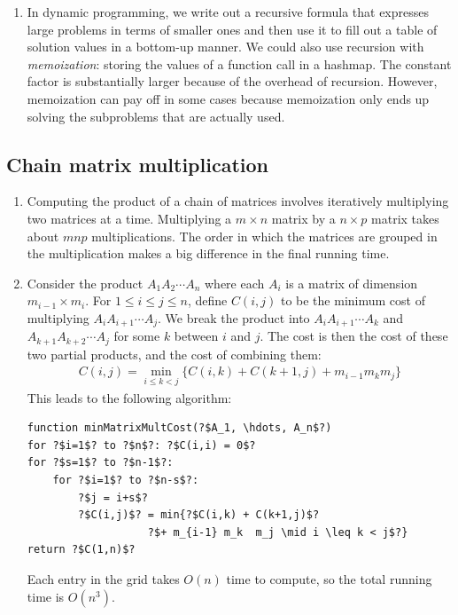 \documentclass[10pt]{article}
\begin{document}
\begin{multicols}{2}
\begin{addmargin}[0.8em]{0.5em}
\begin{enumerate}[label=(\alph*)]
        \item In dynamic programming, we write out a recursive formula that expresses large problems in terms of smaller ones and then use it to fill out a table of solution values in a bottom-up manner. We could also use recursion with \textit{memoization}: storing the values of a function call in a hashmap. The constant factor is substantially larger because of the overhead of recursion. However, memoization can pay off in some cases because memoization only ends up solving the subproblems that are actually used.
    \end{enumerate}    
    \vspace{-0.4cm}
    \subsection{Chain matrix multiplication}
    \vspace{-0.2cm}
    \begin{enumerate}[label=(\alph*)]
        \item Computing the product of a chain of matrices involves iteratively multiplying two matrices at a time. Multiplying a $m \times n$ matrix by a $n \times p$ matrix takes about $mnp$ multiplications. The order in which the matrices are grouped in the multiplication makes a big difference in the final running time.
        \item Consider the product $A_1A_2 \cdots A_n$ where each $A_i$ is a matrix of dimension $m_{i-1} \times m_i$. For $1 \leq i \leq j \leq n$, define $C(i,j)$ to be the minimum cost of multiplying $A_iA_{i+1} \cdots A_j$. We break the product into $A_iA_{i+1} \cdots A_k$ and $A_{k+1}A_{k+2} \cdots A_j$ for some $k$ between $i$ and $j$. The cost is then the cost of these two partial products, and the cost of combining them:
        \begin{align*}
        C(i,j) = \min_{i \leq k < j} \{ C(i,k) + C(k+1,j) + m_{i-1} m_k  m_j \}
        \end{align*}        
        This leads to the following algorithm:
        \begin{verbatim}
function minMatrixMultCost(?$A_1, \hdots, A_n$?)
for ?$i=1$? to ?$n$?: ?$C(i,i) = 0$?
for ?$s=1$? to ?$n-1$?:
    for ?$i=1$? to ?$n-s$?:
        ?$j = i+s$?
        ?$C(i,j)$? = min{?$C(i,k) + C(k+1,j)$? 
                   ?$+ m_{i-1} m_k  m_j \mid i \leq k < j$?}
return ?$C(1,n)$?
        \end{verbatim}        
        Each entry in the grid takes $O(n)$ time to compute, so the total running time is $O(n^3)$.
    \end{enumerate}   
    

\end{addmargin}
\end{multicols}
\end{document}
